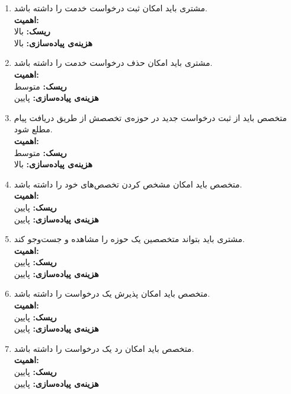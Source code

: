 \begin{enumerate}
	\item
مشتری باید امکان ثبت درخواست خدمت را داشته باشد.
	\\
	\textbf{اهمیت:} 
	\\
	\textbf{ریسک:} بالا
	\\
	\textbf{هزینه‌ی پیاده‌سازی:} بالا
	
	\item
	مشتری باید امکان حذف درخواست خدمت را داشته باشد.
	\\
	\textbf{اهمیت:} 
	\\
	\textbf{ریسک:} متوسط
	\\
	\textbf{هزینه‌ی پیاده‌سازی:} پایین
	
	\item
	متخصص باید از ثبت درخواست جدید در حوزه‌ی تخصصش از طریق دریافت پیام مطلع شود.
	\\
	\textbf{اهمیت:} 
	\\
	\textbf{ریسک:} متوسط
	\\
	\textbf{هزینه‌ی پیاده‌سازی:} بالا
	
		\item
متخصص باید امکان مشخص کردن تخصص‌های خود را داشته باشد.
	\\
	\textbf{اهمیت:} 
	\\
	\textbf{ریسک:} پایین
	\\
	\textbf{هزینه‌ی پیاده‌سازی:} پایین
	
			\item
	مشتری باید بتواند متخصصین یک حوزه را مشاهده و جست‌و‌جو کند.
	\\
	\textbf{اهمیت:} 
	\\
	\textbf{ریسک:} پایین
	\\
	\textbf{هزینه‌ی پیاده‌سازی:} پایین
	
	
	\item
	متخصص باید امکان پذیرش یک درخواست را داشته باشد.
	\\
	\textbf{اهمیت:} 
	\\
	\textbf{ریسک:} پایین
	\\
	\textbf{هزینه‌ی پیاده‌سازی:} پایین
	
	\item
	متخصص باید امکان رد یک درخواست را داشته باشد.
	\\
	\textbf{اهمیت:} 
	\\
	\textbf{ریسک:} پایین
	\\
	\textbf{هزینه‌ی پیاده‌سازی:} پایین
	

\end{enumerate}
